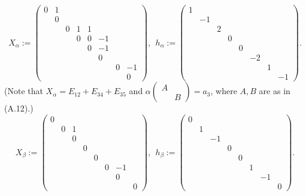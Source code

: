 \documentclass[12pt,letterpaper]{amsart}
\theoremstyle{plain}
\theoremstyle{definition}
\theoremstyle{remark}
\theoremstyle{definition}
\begin{document}
\medskip
\[
X_{\alpha} :=
\begin{pmatrix} 0&1& & & & & & \\
          &0& & & & & & \\
          & &0&1&1& & & \\
          & & &0&0&-1& & \\
          & & & &0&-1& & \\
          & & & & &0& & \\
          & & & & & &0&-1\\
          & & & & & & &0
         \end{pmatrix},\ \
h_{\alpha} := \begin{pmatrix} 1& & & & & & & \\
                          &-1& & & & & & \\
                          & &2& & & & & \\
                          & & &0& & & & \\
                          & & & &0& & & \\
                          & & & & &-2& & \\
                          & & & & & &1& \\
                          & & & & & & &-1
                         \end{pmatrix}.
\]
(Note that $X_{\alpha} = E_{12} + E_{34} + E_{35}$ and
$\alpha\begin{pmatrix} A& \\ &B\end{pmatrix} =a_3$, where $A,B$ are as
in (A.12).)
\[
X_{\beta} :=
\begin{pmatrix} 0& & & & & & & \\
          &0&1& & & & & \\
          & &0& & & & & \\
          & & &0& & & & \\
          & & & &0& & & \\
          & & & & &0&-1& \\
          & & & & & &0&\\
          & & & & & & &0
         \end{pmatrix},\ \
h_{\beta} := \begin{pmatrix} 0& & & & & & & \\
                          &1& & & & & & \\
                          & &-1& & & & & \\
                          & & &0& & & & \\
                          & & & &0& & & \\
                          & & & & &1& & \\
                          & & & & & &-1& \\
                          & & & & & & &0
                         \end{pmatrix}.
\]
\end{document}

